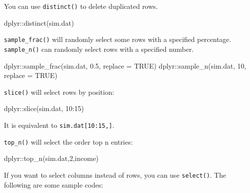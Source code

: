 \documentclass[
  12pt,
]{krantz}
\makeatletter
\newenvironment{Shaded}{\begin{snugshade}}{\end{snugshade}}
\newcommand{\AttributeTok}[1]{\textcolor[rgb]{0.61,0.61,0.61}{#1}}
\newcommand{\ConstantTok}[1]{\textcolor[rgb]{0,0,0}{#1}}
\newcommand{\DecValTok}[1]{\textcolor[rgb]{0.06,0.06,0.06}{#1}}
\newcommand{\FloatTok}[1]{\textcolor[rgb]{0.06,0.06,0.06}{#1}}
\newcommand{\FunctionTok}[1]{\textcolor[rgb]{0,0,0}{#1}}
\newcommand{\NormalTok}[1]{#1}
\newcommand{\SpecialCharTok}[1]{\textcolor[rgb]{0,0,0}{#1}}
\newenvironment{kframe}{%
\medskip{}
\setlength{\fboxsep}{.8em}
 \def\at@end@of@kframe{}%
 \ifinner\ifhmode%
  \def\at@end@of@kframe{\end{minipage}}%
  \begin{minipage}{\columnwidth}%
 \fi\fi%
 \def\FrameCommand##1{\hskip\@totalleftmargin \hskip-\fboxsep
 \colorbox{shadecolor}{##1}\hskip-\fboxsep
     \hskip-\linewidth \hskip-\@totalleftmargin \hskip\columnwidth}%
 \MakeFramed {\advance\hsize-\width
   \@totalleftmargin\z@ \linewidth\hsize
   \@setminipage}}%
 {\par\unskip\endMakeFramed%
 \at@end@of@kframe}
\renewenvironment{Shaded}{\begin{kframe}}{\end{kframe}}
\makeatother
\begin{document}
You can use \texttt{distinct()} to delete duplicated rows.

\begin{Shaded}
\begin{Highlighting}[]
\NormalTok{dplyr}\SpecialCharTok{::}\FunctionTok{distinct}\NormalTok{(sim.dat)}
\end{Highlighting}
\end{Shaded}

\texttt{sample\_frac()} will randomly select some rows with a specified percentage. \texttt{sample\_n()} can randomly select rows with a specified number.

\begin{Shaded}
\begin{Highlighting}[]
\NormalTok{dplyr}\SpecialCharTok{::}\FunctionTok{sample\_frac}\NormalTok{(sim.dat, }\FloatTok{0.5}\NormalTok{, }\AttributeTok{replace =} \ConstantTok{TRUE}\NormalTok{) }
\NormalTok{dplyr}\SpecialCharTok{::}\FunctionTok{sample\_n}\NormalTok{(sim.dat, }\DecValTok{10}\NormalTok{, }\AttributeTok{replace =} \ConstantTok{TRUE}\NormalTok{) }
\end{Highlighting}
\end{Shaded}

\texttt{slice()} will select rows by position:

\begin{Shaded}
\begin{Highlighting}[]
\NormalTok{dplyr}\SpecialCharTok{::}\FunctionTok{slice}\NormalTok{(sim.dat, }\DecValTok{10}\SpecialCharTok{:}\DecValTok{15}\NormalTok{) }
\end{Highlighting}
\end{Shaded}

It is equivalent to \texttt{sim.dat{[}10:15,{]}}.

\texttt{top\_n()} will select the order top n entries:

\begin{Shaded}
\begin{Highlighting}[]
\NormalTok{dplyr}\SpecialCharTok{::}\FunctionTok{top\_n}\NormalTok{(sim.dat,}\DecValTok{2}\NormalTok{,income)}
\end{Highlighting}
\end{Shaded}

If you want to select columns instead of rows, you can use \texttt{select()}. The following are some sample codes:
\end{document}

